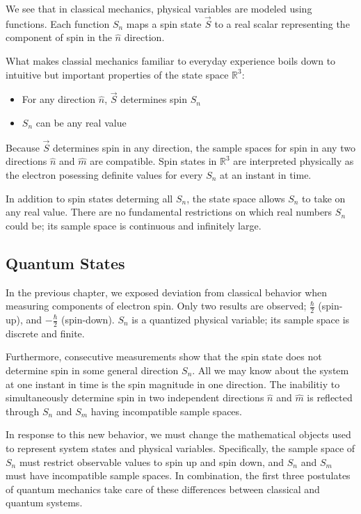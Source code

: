 We see that in classical mechanics, physical variables are modeled using functions. Each function $S_n$ maps a spin state $\vec{S}$ to a real scalar representing the component of spin in the $\hat{n}$ direction.

What makes classial mechanics familiar to everyday experience boils down to intuitive but important properties of the state space $\mathbb{R}^3$:
\begin{itemize}
\item For any direction $\hat{n}$, $\vec{S}$ determines spin $S_n$
\item $S_n$ can be any real value
\end{itemize}

Because $\vec{S}$ determines spin in any direction, the sample spaces for spin in any two directions $\hat{n}$ and $\hat{m}$ are compatible. Spin states in $\mathbb{R}^3$ are interpreted physically as the electron posessing definite values for every $S_n$ at an instant in time.

In addition to spin states determing all $S_n$, the state space allows $S_n$ to take on any real value. There are no fundamental restrictions on which real numbers $S_n$ could be; its sample space is continuous and infinitely large.

\subsection{Quantum States}
In the previous chapter, we exposed deviation from classical behavior when measuring components of electron spin. Only two results are observed; $\frac{\hbar}{2}$ (spin-up), and $-\frac{\hbar}{2}$ (spin-down). $S_n$ is a quantized physical variable; its sample space is discrete and finite.

Furthermore, consecutive measurements show that the spin state does not determine spin in some general direction $S_n$. All we may know about the system at one instant in time is the spin magnitude in one direction. The inabilitiy to simultaneously determine spin in two independent directions $\hat{n}$ and $\hat{m}$ is reflected through $S_n$ and $S_m$ having incompatible sample spaces.

In response to this new behavior, we must change the mathematical objects used to represent system states and physical variables. Specifically, the sample space of $S_n$ must restrict observable values to spin up and spin down, and $S_n$ and $S_m$ must have incompatible sample spaces. In combination, the first three postulates of quantum mechanics take care of these differences between classical and quantum systems.

